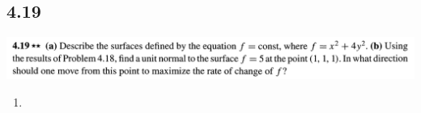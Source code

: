 \subsection{4.19}
\begin{mdframed}
  \includegraphics[width=400pt]{img/physics--classical-mechanics--taylor--q-4-19.png}
\end{mdframed}
\begin{enumerate}[label=(\alph*)]
\item
\end{enumerate}




